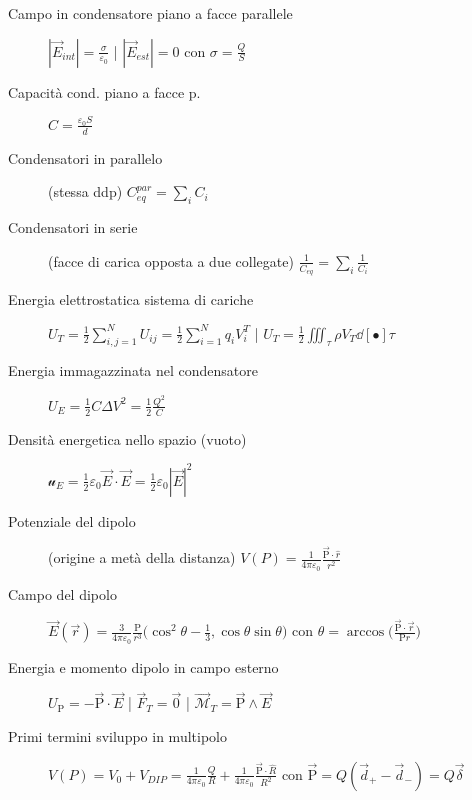 \documentclass[10pt, oneside]{article}
\begin{document}
\begin{description}
\item[Campo in condensatore piano a facce parallele] \hfill $\displaystyle |\vec{E}_{int}| = \frac{\sigma}{\varepsilon_0}$ \quad | \quad $\displaystyle |\vec{E}_{est}| = 0$ con $\sigma = \frac{Q}{S}$

\item[Capacità cond. piano a facce p.] \hfill $\displaystyle C = \frac{\varepsilon_0 S}{d}$

\item[Condensatori in parallelo] (stessa ddp) \hfill $\displaystyle C_{eq}^{par} = \sum_i C_i$

\item[Condensatori in serie] (facce di carica opposta a due collegate) \hfill $\displaystyle \frac{1}{C_{eq}} = \sum_i \frac{1}{C_i}$

\item[Energia elettrostatica sistema di cariche] \hfill $\displaystyle U_T = \frac{1}{2} \sum\limits_{i,j=1}^{N} U_{ij} = \frac{1}{2} \sum\limits_{i=1}^{N} q_i V_{i}^{T}$ \quad | \quad $\displaystyle U_T = \frac{1}{2} \iiint_\tau \rho V_T \dd[•]{\tau}$

\item[Energia immagazzinata nel condensatore] \hfill $\displaystyle U_{E} = \frac{1}{2} C \Delta V^2 = \frac{1}{2} \frac{Q^2}{C}$

\item[Densità energetica nello spazio (vuoto)] \hfill $\displaystyle \mathcal{u}_E = \frac{1}{2} \varepsilon_0 \vec{E} \cdot \vec{E} = \frac{1}{2} \varepsilon_0 |\vec{E}|^2$

\item[Potenziale del dipolo] (origine a metà della distanza) \hfill $\displaystyle V(P) = \frac{1}{4 \pi \varepsilon_0} \frac{\vec{\mathrm{P}} \cdot \hat{r}}{r^2}$

\item[Campo del dipolo] \hfill $\displaystyle \vec{E}(\vec{r}) = \frac{3}{4 \pi \varepsilon_0} \frac{\mathrm{P}}{r^3} \big(\cos^2 \theta - \frac{1}{3}, \cos \theta \sin \theta \big)$ \qquad con $\displaystyle \theta = \arccos\big(\frac{\vec{\mathrm{P}} \cdot \vec{r}}{\mathrm{P} r}\big)$

\item[Energia e momento dipolo in campo esterno] \hfill $\displaystyle U_{\mathrm{P}} = - \vec{\mathrm{P}} \cdot \vec{E}$ \quad | \quad $\displaystyle \vec{F}_T = \vec{0}$ \quad | \quad $\displaystyle \vec{\mathcal{M}}_T = \vec{\mathrm{P}} \wedge \vec{E}$

\item[Primi termini sviluppo in multipolo] \hfill $\displaystyle V(P) = V_0 + V_{DIP} = \frac{1}{4 \pi \varepsilon_0} \frac{Q}{R} + \frac{1}{4 \pi \varepsilon_0} \frac{\vec{\mathrm{P}} \cdot \hat{R}}{R^2}$ \qquad con $\vec{\mathrm{P}} = Q ( \vec{d}_{+} - \vec{d}_{-}) = Q \vec{\delta}$


\end{description}
\end{document}
